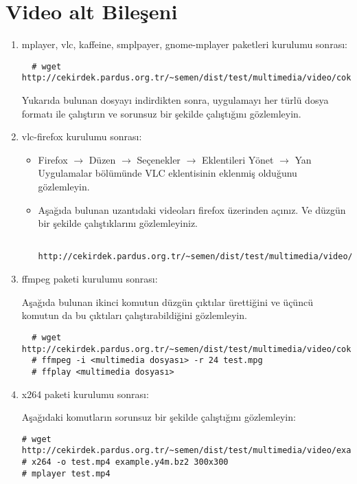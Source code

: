 \documentclass[a4paper,10pt]{article}
\begin{document}
\section{Video alt Bileşeni}
\begin{enumerate}
 \item mplayer, vlc, kaffeine, smplpayer, gnome-mplayer paketleri kurulumu sonrası:
 \begin{verbatim}
  # wget http://cekirdek.pardus.org.tr/~semen/dist/test/multimedia/video/cokluortam.tar
 \end{verbatim}
Yukarıda bulunan dosyayı indirdikten sonra, uygulamayı her türlü dosya formatı ile çalıştırın ve sorunsuz bir şekilde çalıştığını gözlemleyin.
 \item vlc-firefox kurulumu sonrası:
 \begin{itemize}
  \item Firefox $\rightarrow$ Düzen $\rightarrow$ Seçenekler $\rightarrow$ Eklentileri Yönet $\rightarrow$ Yan Uygulamalar bölümünde VLC eklentisinin eklenmiş olduğunu gözlemleyin.
  \item Aşağıda bulunan uzantıdaki videoları firefox üzerinden açınız. Ve düzgün bir şekilde çalıştıklarını gözlemleyiniz.
  \begin{verbatim}
  http://cekirdek.pardus.org.tr/~semen/dist/test/multimedia/video/cokluortam/  
  \end{verbatim}
 \end{itemize}
\item ffmpeg paketi kurulumu sonrası:
 
Aşağıda bulunan ikinci komutun düzgün çıktılar ürettiğini ve üçüncü komutun da bu çıktıları çalıştırabildiğini gözlemleyin.
\begin{verbatim}
  # wget http://cekirdek.pardus.org.tr/~semen/dist/test/multimedia/video/cokluortam.tar 
  # ffmpeg -i <multimedia dosyası> -r 24 test.mpg
  # ffplay <multimedia dosyası>
  \end{verbatim}
\item x264 paketi kurulumu sonrası:

Aşağıdaki komutların sorunsuz bir şekilde çalıştığını gözlemleyin:
\begin{verbatim}
# wget  http://cekirdek.pardus.org.tr/~semen/dist/test/multimedia/video/example.y4m.bz2
# x264 -o test.mp4 example.y4m.bz2 300x300 
# mplayer test.mp4
\end{verbatim}

\end{enumerate}
\end{document}
